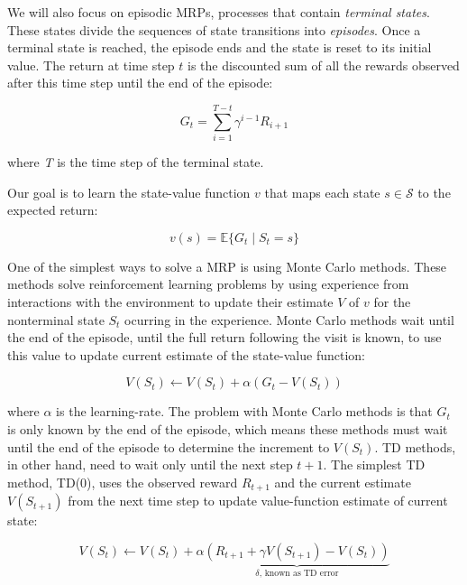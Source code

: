 \documentclass{article}
\begin{document}
We will also focus on episodic MRPs, processes that contain \emph{terminal states}.
These states divide the sequences of state transitions into \emph{episodes}.
Once a terminal state is reached, the episode ends and the state is reset to its initial value.
The return at time step \(t\) is the discounted sum of all the rewards observed after this time step until the end of the episode:

\begin{equation}
    G_{t} = \sum_{i=1}^{T-t} \gamma^{i-1} R_{i+1}\label{eqn:1}
\end{equation}

where \emph{T} is the time step of the terminal state.

Our goal is to learn the state-value function $v$ that maps each state $s \in \mathcal{S}$ to the expected return:

\begin{equation}
    v(s) = \mathbb{E}\{G_{t} \mid S_{t} = s\}\label{eqn:2}
\end{equation}

One of the simplest ways to solve a MRP is using Monte Carlo methods.
These methods solve reinforcement learning problems by using experience from interactions with the environment to update their estimate $V$ of $v$ for the nonterminal state $S_{t}$ ocurring in the experience.
Monte Carlo methods wait until the end of the episode, until the full return following the visit is known, to use this value to update current estimate of the state-value function:

\begin{equation}
    V(S_{t}) \leftarrow V(S_{t}) + \alpha(G_{t} - V(S_{t}))\label{eqn:3}
\end{equation}


where $\alpha$ is the learning-rate.
The problem with Monte Carlo methods is that $G_{t}$ is only known by the end of the episode, which means these methods must wait until the end of the episode to determine the increment to $V(S_{t})$.
TD methods, in other hand, need to wait only until the next step $t + 1$.
The simplest TD method, TD(0), uses the observed reward $R_{t+1}$ and the current estimate $V(S_{t+1})$ from the next time step to update value-function estimate of current state:

\begin{equation}
    V(S_{t}) \leftarrow V(S_{t}) + \alpha \underbrace{(R_{t+1} + \gamma V(S_{t+1}) - V(S_{t}))}_{\delta \text{, known as TD error}} \label{eqn:4}
\end{equation}
\end{document}
